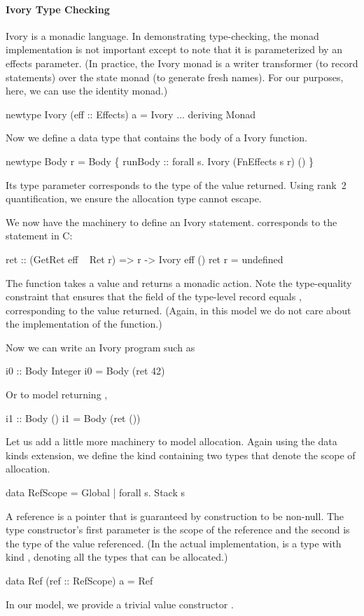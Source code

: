 \paragraph{Ivory Type Checking}
Ivory is a monadic language.  In demonstrating type-checking, the monad
implementation is not important except to note that it is parameterized by an
effects parameter.  (In practice, the Ivory monad is a writer transformer (to
record statements) over the state monad (to generate fresh names).  For our
purposes, here, we can use the identity monad.)
\begin{code}
newtype Ivory (eff :: Effects) a = Ivory ...
  deriving Monad
\end{code}
\noindent
Now we define a data type  that contains the body of a Ivory
function.
\begin{code}
newtype Body r = Body
  \{ runBody :: forall s. Ivory (FnEffects s r) () \}
\end{code}
\noindent
Its type parameter corresponds to the type of the value returned.  Using rank~2
quantification, we ensure the allocation type cannot escape.

We now have the machinery to define an Ivory statement.   corresponds to
the  statement in C:
\begin{code}
ret :: (GetRet eff ~ Ret r) => r -> Ivory eff ()
ret r = undefined
\end{code}
\noindent
The function  takes a value and returns a monadic action.  Note the
type-equality constraint that ensures that the  field of the type-level
record equals , corresponding to the value returned.  (Again, in this
model we do not care about the implementation of the function.)

Now we can write an Ivory program such as
\begin{code}
i0 :: Body Integer
i0 = Body (ret 42)
\end{code}
\noindent
Or to model returning ,
\begin{code}
i1 :: Body ()
i1 = Body (ret ())
\end{code}

Let us add a little more machinery to model allocation.  Again using the data
kinds extension, we define the kind  containing two types that
denote the scope of allocation.
\begin{code}
data RefScope = Global | forall s. Stack s
\end{code}
\noindent
A reference is a pointer that is guaranteed by construction to be non-null.  The
type constructor's first parameter is the scope of the reference and the second
is the type of the value referenced.  (In the actual implementation,  is a
type with kind , denoting all the types that can be allocated.)
\begin{code}
data Ref (ref :: RefScope) a = Ref
\end{code}
\noindent
In our model, we provide a trivial value constructor .


